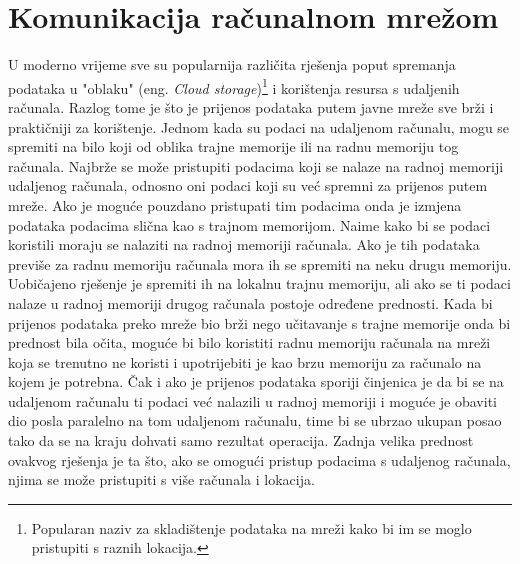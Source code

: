 \documentclass[times, utf8, zavrsni, square]{fer}
\begin{document}
\chapter{Komunikacija računalnom mrežom}
U moderno vrijeme sve su popularnija različita rješenja poput spremanja podataka u "oblaku" (eng. \textit{Cloud storage})\footnote{Popularan naziv za skladištenje podataka na mreži kako bi im se moglo pristupiti s raznih lokacija.} i korištenja resursa s udaljenih računala.
Razlog tome je što je prijenos podataka putem javne mreže sve brži i praktičniji za korištenje.
Jednom kada su podaci na udaljenom računalu, mogu se spremiti na bilo koji od oblika trajne memorije ili na radnu memoriju tog računala.
Najbrže se može pristupiti podacima koji se nalaze na radnoj memoriji udaljenog računala, odnosno oni podaci koji su već spremni za prijenos putem mreže.
Ako je moguće pouzdano pristupati tim podacima onda je izmjena podataka podacima slična kao s trajnom memorijom.
Naime kako bi se podaci koristili moraju se nalaziti na radnoj memoriji računala. Ako je tih podataka previše za radnu memoriju računala mora ih se spremiti na neku drugu memoriju.
Uobičajeno rješenje je spremiti ih na lokalnu trajnu memoriju, ali ako se ti podaci nalaze u radnoj memoriji drugog računala postoje određene prednosti.
Kada bi prijenos podataka preko mreže bio brži nego učitavanje s trajne memorije onda bi prednost bila očita, moguće bi bilo koristiti radnu memoriju računala na mreži koja se trenutno ne koristi i upotrijebiti je kao brzu memoriju za računalo na kojem je potrebna.
Čak i ako je prijenos podataka sporiji činjenica je da bi se na udaljenom računalu ti podaci već nalazili u radnoj memoriji i
moguće je obaviti dio posla paralelno na tom udaljenom računalu, time bi se ubrzao ukupan posao tako da se na kraju dohvati samo rezultat operacija.
Zadnja velika prednost ovakvog rješenja je ta što, ako se omogući pristup podacima s udaljenog računala, njima se može pristupiti s više računala i lokacija.
\FloatBarrier
\pagebreak
\end{document}
